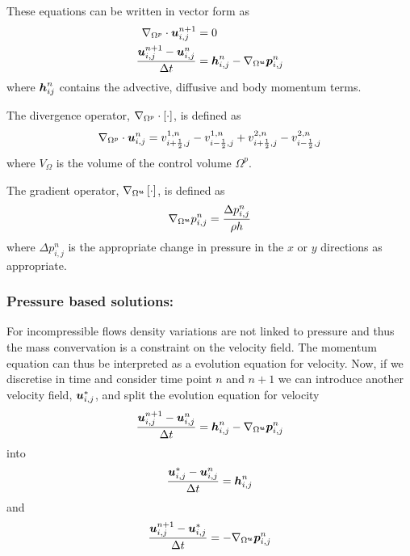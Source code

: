 These equations can be written in vector form as
\begin{equation}
  \begin{split}
    \divergence{\Omega^{p}}{\vectr{u}^{n+1}_{i,j}}&=0\\
    \dfrac{\vectr{u}^{n+1}_{i,j}-\vectr{u}^{n}_{i,j}}{\Delta
      t}&=\vectr{h}^{n}_{i,j}-\gradient{\Omega^{\vectr{u}}}{\vectr{p}^{n}_{i,j}}
  \end{split}
\end{equation}
where $\boldsymbol{h}^{n}_{ij}$ contains the advective, diffusive and body momentum
terms.

The divergence operator, $\divergence{\Omega^{p}}{\sqbrac{\cdot}}$, is defined as
\begin{equation}
  \divergence{\Omega^{p}}{\vectr{u}^{n}_{i,j}}=v^{1,n}_{i+\frac{1}{2},j}-v^{1,n}_{i-\frac{1}{2},j}+v^{2,n}_{i+\frac{1}{2},j}-v^{2,n}_{i-\frac{1}{2},j}
\end{equation}
where $V_{\Omega}$ is the volume of the control volume $\Omega^{p}$.

The gradient operator, $\gradient{\Omega^{\vectr{u}}}{\sqbrac{\cdot}}$, is
defined as
\begin{equation}
  \gradient{\Omega^{\vectr{u}}}{p^{n}_{i,j}}=\dfrac{\Delta p^{n}_{i,j}}{\rho h}
\end{equation}
where $\Delta p^{n}_{i,j}$ is the appropriate change in pressure in the $x$ or
$y$ directions as appropriate.

\subsubsection{Pressure based solutions:}

For incompressible flows density variations are not linked to pressure and
thus the mass convervation is a constraint on the velocity field. The momentum
equation can thus be interpreted as a evolution equation for velocity. Now, if we
discretise in time and consider time point $n$ and $n+1$ we can introduce
another velocity field, $\boldsymbol{u}^{*}_{i,j}$, and split the evolution
equation for velocity
\begin{equation}
  \dfrac{\vectr{u}^{n+1}_{i,j}-\vectr{u}^{n}_{i,j}}{\Delta
    t}=\vectr{h}^{n}_{i,j}-\gradient{\Omega^{\vectr{u}}}{\vectr{p}^{n}_{i,j}}
\end{equation}
into
\begin{equation}
  \dfrac{\boldsymbol{u}^{*}_{i,j}-\boldsymbol{u}^{n}_{i,j}}{\Delta t}=\boldsymbol{h}^{n}_{i,j}
\end{equation}
and
\begin{equation}
  \dfrac{\vectr{u}^{n+1}_{i,j}-\vectr{u}^{*}_{i,j}}{\Delta t}=-\gradient{\Omega^{\vectr{u}}}{\vectr{p}^{n}_{i,j}}
\end{equation}


